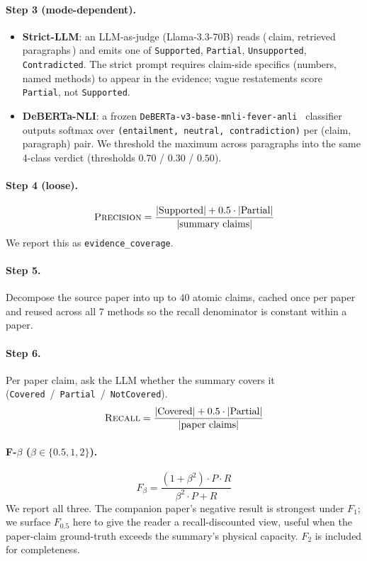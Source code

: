 \documentclass[11pt,a4paper]{article}
\begin{document}
\paragraph{Step 3 (mode-dependent).}
\begin{itemize}[leftmargin=*,itemsep=1pt]
    \item \textbf{Strict-LLM}: an LLM-as-judge (Llama-3.3-70B) reads
          (\,claim, retrieved paragraphs\,) and emits one of
          \texttt{Supported}, \texttt{Partial}, \texttt{Unsupported},
          \texttt{Contradicted}. The strict prompt requires
          claim-side specifics (numbers, named methods) to appear
          in the evidence; vague restatements score
          \texttt{Partial}, not \texttt{Supported}.
    \item \textbf{DeBERTa-NLI}: a frozen
          \texttt{DeBERTa-v3-base-mnli-fever-anli}~\cite{he2021debertav3}
          classifier outputs softmax over
          \texttt{(entailment, neutral, contradiction)} per
          (claim, paragraph) pair. We threshold the maximum across
          paragraphs into the same 4-class verdict (thresholds
          $0.70$ / $0.30$ / $0.50$).
\end{itemize}

\paragraph{Step 4 (loose).}
\[
\textsc{Precision} = \frac{|\text{Supported}| + 0.5 \cdot |\text{Partial}|}
                          {|\text{summary claims}|}
\]
We report this as \texttt{evidence\_coverage}.

\paragraph{Step 5.}
Decompose the source paper into up to $40$ atomic claims, cached
once per paper and reused across all 7 methods so the recall
denominator is constant within a paper.

\paragraph{Step 6.}
Per paper claim, ask the LLM whether the summary covers it
(\texttt{Covered}~/~\texttt{Partial}~/~\texttt{NotCovered}).
\[
\textsc{Recall} = \frac{|\text{Covered}| + 0.5 \cdot |\text{Partial}|}
                       {|\text{paper claims}|}
\]

\paragraph{F-$\beta$ ($\beta \in \{0.5, 1, 2\}$).}
\[
F_\beta = \frac{(1+\beta^2) \cdot P \cdot R}{\beta^2 \cdot P + R}
\]
We report all three. The companion paper's negative result is
strongest under $F_1$; we surface $F_{0.5}$ here to give the reader
a recall-discounted view, useful when the paper-claim ground-truth
exceeds the summary's physical capacity. $F_2$ is included for
completeness.
\end{document}
